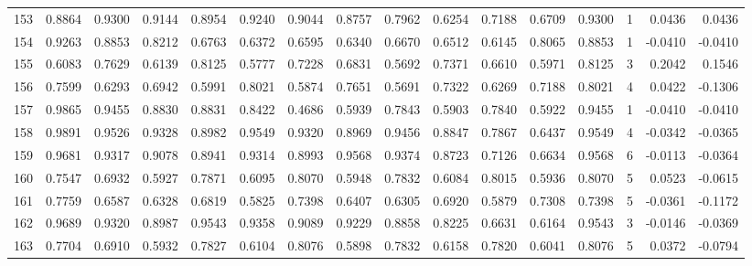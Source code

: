 \begin{tabular}{lrrrrrrrrrrrrrrr}
153 &      0.8864 &  0.9300 &  0.9144 &  0.8954 &  0.9240 &  0.9044 &  0.8757 &  0.7962 &  0.6254 &  0.7188 &   0.6709 &     0.9300 &      1 &                    0.0436 &                     0.0436 \\
154 &      0.9263 &  0.8853 &  0.8212 &  0.6763 &  0.6372 &  0.6595 &  0.6340 &  0.6670 &  0.6512 &  0.6145 &   0.8065 &     0.8853 &      1 &                   -0.0410 &                    -0.0410 \\
155 &      0.6083 &  0.7629 &  0.6139 &  0.8125 &  0.5777 &  0.7228 &  0.6831 &  0.5692 &  0.7371 &  0.6610 &   0.5971 &     0.8125 &      3 &                    0.2042 &                     0.1546 \\
156 &      0.7599 &  0.6293 &  0.6942 &  0.5991 &  0.8021 &  0.5874 &  0.7651 &  0.5691 &  0.7322 &  0.6269 &   0.7188 &     0.8021 &      4 &                    0.0422 &                    -0.1306 \\
157 &      0.9865 &  0.9455 &  0.8830 &  0.8831 &  0.8422 &  0.4686 &  0.5939 &  0.7843 &  0.5903 &  0.7840 &   0.5922 &     0.9455 &      1 &                   -0.0410 &                    -0.0410 \\
158 &      0.9891 &  0.9526 &  0.9328 &  0.8982 &  0.9549 &  0.9320 &  0.8969 &  0.9456 &  0.8847 &  0.7867 &   0.6437 &     0.9549 &      4 &                   -0.0342 &                    -0.0365 \\
159 &      0.9681 &  0.9317 &  0.9078 &  0.8941 &  0.9314 &  0.8993 &  0.9568 &  0.9374 &  0.8723 &  0.7126 &   0.6634 &     0.9568 &      6 &                   -0.0113 &                    -0.0364 \\
160 &      0.7547 &  0.6932 &  0.5927 &  0.7871 &  0.6095 &  0.8070 &  0.5948 &  0.7832 &  0.6084 &  0.8015 &   0.5936 &     0.8070 &      5 &                    0.0523 &                    -0.0615 \\
161 &      0.7759 &  0.6587 &  0.6328 &  0.6819 &  0.5825 &  0.7398 &  0.6407 &  0.6305 &  0.6920 &  0.5879 &   0.7308 &     0.7398 &      5 &                   -0.0361 &                    -0.1172 \\
162 &      0.9689 &  0.9320 &  0.8987 &  0.9543 &  0.9358 &  0.9089 &  0.9229 &  0.8858 &  0.8225 &  0.6631 &   0.6164 &     0.9543 &      3 &                   -0.0146 &                    -0.0369 \\
163 &      0.7704 &  0.6910 &  0.5932 &  0.7827 &  0.6104 &  0.8076 &  0.5898 &  0.7832 &  0.6158 &  0.7820 &   0.6041 &     0.8076 &      5 &                    0.0372 &                    -0.0794 \\

\end{tabular}
